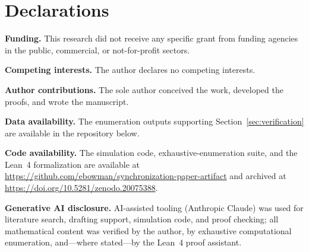 \documentclass[sn-mathphys,NameDate]{sn-jnl}
\theoremstyle{thmstyleone}
\theoremstyle{thmstylethree}
\theoremstyle{thmstyletwo}
\begin{document}
\section*{Declarations}

\textbf{Funding.}
This research did not receive any specific grant from funding
agencies in the public, commercial, or not-for-profit sectors.

\textbf{Competing interests.}
The author declares no competing interests.

\textbf{Author contributions.}
The sole author conceived the work, developed the proofs, and wrote
the manuscript.

\textbf{Data availability.}
The enumeration outputs supporting
Section~\ref{sec:verification} are available in the repository
below.

\textbf{Code availability.}
The simulation code, exhaustive-enumeration suite, and the Lean~4
formalization are available at
\url{https://github.com/ebowman/synchronization-paper-artifact}
and archived at
\url{https://doi.org/10.5281/zenodo.20075388}.

\textbf{Generative AI disclosure.}
AI-assisted tooling (Anthropic Claude) was used for literature
search, drafting support, simulation code, and proof checking; all
mathematical content was verified by the author, by exhaustive
computational enumeration, and---where stated---by the Lean~4 proof
assistant.


\end{document}
